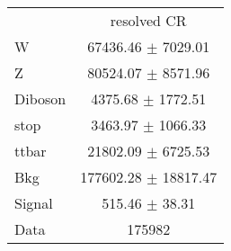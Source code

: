 \begin{tabular}{l|c|}
\cline{2-2}
 & \multicolumn{1}{c|}{resolved CR}\\
W & 67436.46 $\pm$ 7029.01\\
Z & 80524.07 $\pm$ 8571.96\\
Diboson & 4375.68 $\pm$ 1772.51\\
stop & 3463.97 $\pm$ 1066.33\\
ttbar & 21802.09 $\pm$ 6725.53\\
\hline
Bkg & 177602.28 $\pm$ 18817.47\\
\hline
Signal & 515.46 $\pm$ 38.31\\
\hline
Data & 175982 \\
\end{tabular}
